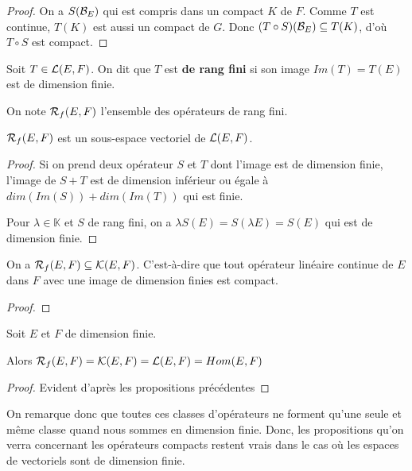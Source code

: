 \begin{proof}
	On a $S(\mathcal{B}_{E})$ qui est compris dans un compact $K$ de $F$. Comme $T$ est
	continue, $T(K)$ est aussi un compact de $G$. Donc $(T \circ
	S)(\mathcal{B}_{E}) \subseteq T(K)$, d'où $T \circ S$ est compact.
\end{proof}

\begin{definition}
	Soit $T \in \mathcal{L}(E, F)$. On dit que $T$ est \textbf{de rang fini}
	si son image $Im(T) = T(E)$ est de dimension finie.

	On note $\mathcal{R}_{f}(E, F)$ l'ensemble des opérateurs de rang fini.
\end{definition}

\begin{proposition}
	$\mathcal{R}_{f}(E, F)$ est un sous-espace vectoriel de
	$\mathcal{L}(E, F)$.
\end{proposition}

\begin{proof}
	Si on prend deux opérateur $S$ et $T$ dont l'image est de dimension finie,
	l'image de $S + T$ est de dimension inférieur ou égale à $dim(Im(S)) +
	dim(Im(T))$ qui est finie.

	Pour $\lambda \in \mathbb{K}$ et $S$ de rang fini, on a $\lambda S(E) =
	S(\lambda E) = S(E)$ qui est de dimension finie.
\end{proof}

\begin{proposition}
	On a $\mathcal{R}_{f}(E, F) \subseteq \mathcal{K}(E, F)$. C'est-à-dire
	que tout opérateur linéaire continue de $E$ dans $F$ avec une image de
	dimension finies est compact.
\end{proposition}

\begin{proof}
	
\end{proof}

\begin{proposition}
	Soit $E$ et $F$ de dimension finie.
	
	Alors $\mathcal{R}_{f}(E, F) = \mathcal{K}(E, F) =
	\mathcal{L}(E, F) = Hom(E, F)$
\end{proposition}

\begin{proof}
	Evident d'après les propositions précédentes
\end{proof}

On remarque donc que toutes ces classes d'opérateurs ne forment qu'une seule et
même classe quand nous sommes en dimension finie. Donc, les propositions qu'on
verra concernant les opérateurs compacts restent vrais dans le cas où les
espaces de vectoriels sont de dimension finie.

